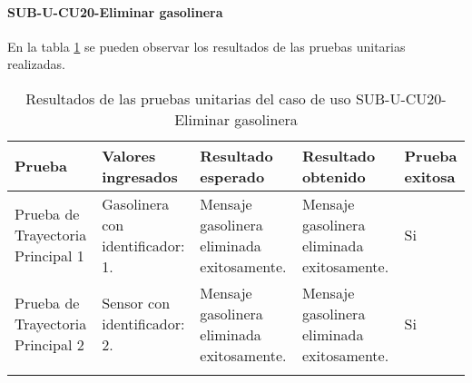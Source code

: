 \paragraph{SUB-U-CU20-Eliminar gasolinera}\label{SUB-U-CU20:Pruebas}
En la tabla \ref{pruebas_unitarias_sub-u-cu20} se pueden observar los resultados de las pruebas unitarias realizadas.
\begin{longtable}{|M{2cm}| M{4.5cm}|M{3cm}|M{3cm}|M{1.5cm}|}
	\hline
	\textbf{Prueba} & \textbf{Valores ingresados} & \textbf{Resultado esperado} & \textbf{Resultado obtenido} & \textbf{Prueba exitosa} \\ \hline
	Prueba de Trayectoria Principal 1 & 
	Gasolinera con identificador: 1.
	& 
	Mensaje gasolinera eliminada exitosamente.
	&
	Mensaje gasolinera eliminada exitosamente.
	& Si \\ \hline

	Prueba de Trayectoria Principal 2 & 
	Sensor con identificador: 2.
	& 
	Mensaje gasolinera eliminada exitosamente.
	&
	Mensaje gasolinera eliminada exitosamente.
	& Si \\ \hline

	\caption{Resultados de las pruebas unitarias del caso de uso SUB-U-CU20-Eliminar gasolinera}
	\label{pruebas_unitarias_sub-u-cu20}
\end{longtable}